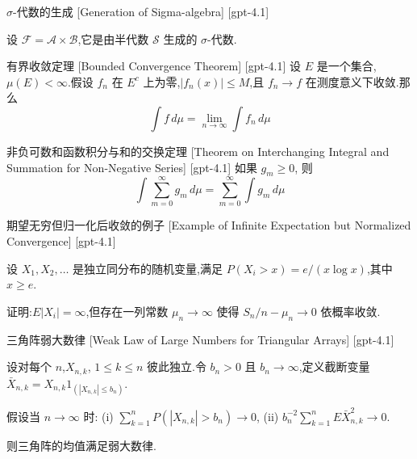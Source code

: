 \documentclass[UTF8]{ctexart}
\begin{document}
    
    
    \begin{dfn}
        {$\sigma$-代数的生成}
        [Generation of Sigma-algebra]
        [gpt-4.1]
        
设 $\mathcal{F} = \mathcal{A} \times \mathcal{B}$,它是由半代数 $\mathcal{S}$ 生成的 $\sigma$-代数.

    \end{dfn}
    
    
    
    \begin{thm}
        {有界收敛定理}
        [Bounded Convergence Theorem]
        [gpt-4.1]
        设 $E$ 是一个集合,$\mu(E) < \infty$.假设 $f_n$ 在 $E^c$ 上为零,$|f_n(x)| \leq M$,且 $f_n \to f$ 在测度意义下收敛.那么
\[
\int f\, d\mu = \lim_{n \to \infty} \int f_n\, d\mu
\]

    \end{thm}
    
    
    
    \begin{thm}
        {非负可数和函数积分与和的交换定理}
        [Theorem on Interchanging Integral and Summation for Non-Negative Series]
        [gpt-4.1]
        如果 $g_{m} \geq 0$, 则
\[
\int \sum_{m = 0}^{\infty} g_{m} \, d\mu = \sum_{m = 0}^{\infty} \int g_{m} \, d\mu
\]

    \end{thm}
    
    
    
    \begin{xmp}
        {期望无穷但归一化后收敛的例子}
        [Example of Infinite Expectation but Normalized Convergence]
        [gpt-4.1]
        
设 $X_{1}, X_{2}, \dots$ 是独立同分布的随机变量,满足 $P(X_{i} > x) = e / (x \log x)$,其中 $x \geq e$.

证明:$E|X_{i}| = \infty$,但存在一列常数 $\mu_{n} \to \infty$ 使得 $S_{n} / n - \mu_{n} \to 0$ 依概率收敛.

    \end{xmp}
    
    
    
    \begin{thm}
        {三角阵弱大数律}
        [Weak Law of Large Numbers for Triangular Arrays]
        [gpt-4.1]
        
设对每个 $n$,$X_{n,k}$, $1 \leq k \leq n$ 彼此独立.令 $b_n > 0$ 且 $b_n \to \infty$,定义截断变量 $\bar{X}_{n,k} = X_{n,k} 1_{(|X_{n,k}| \leq b_n)}$.

假设当 $n \to \infty$ 时:
(i) $\sum_{k=1}^n P(|X_{n,k}| > b_n) \to 0$,
(ii) $b_n^{-2} \sum_{k=1}^n E \bar{X}_{n,k}^2 \to 0$.

则三角阵的均值满足弱大数律.

    \end{thm}
    
\end{document}
